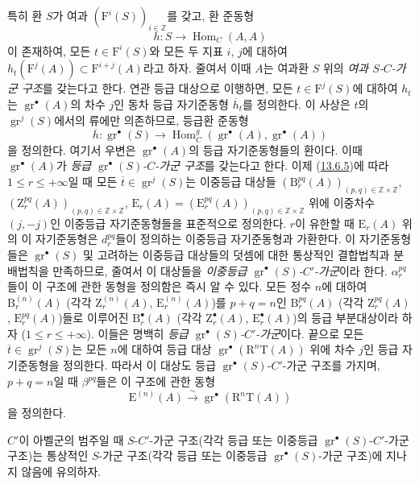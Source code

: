 \begin{env}[13.6.6]
\label{0.13.6.6-fr}
특히 환 $S$가 여과 $(\mathrm F^i(S))_{i\in\mathbb Z}$를 갖고,
환 준동형
\begin{equation}
\label{0.13.6.6.1-fr}
\tag{13.6.6.1}
h:S\to\operatorname{Hom}_C(A,A)
\end{equation}
이 존재하여,
모든 $t\in\mathrm F^i(S)$와 모든 두 지표 $i$, $j$에 대하여
$h_t(\mathrm F^j(A))\subset\mathrm F^{i+j}(A)$라고 하자. 줄여서 이때
$A$는 여과환 $S$ 위의 \emph{여과 $S$-$C$-가군 구조}를 갖는다고 한다.
연관 등급 대상으로 이행하면, 모든 $t\in\mathrm F^j(S)$에 대하여
$h_t$는 $\operatorname{gr}^\bullet(A)$의 차수 $j$인 동차 등급
자기준동형 $\overline h_t$를 정의한다. 이 사상은 $t$의
$\operatorname{gr}^j(S)$에서의 류에만 의존하므로, 등급환 준동형
\[
\overline h:\operatorname{gr}^\bullet(S)\to
\operatorname{Hom}_C^g(\operatorname{gr}^\bullet(A),
\operatorname{gr}^\bullet(A))
\]
을 정의한다. 여기서 우변은 $\operatorname{gr}^\bullet(A)$의 등급
자기준동형들의 환이다. 이때 $\operatorname{gr}^\bullet(A)$가
\emph{등급 $\operatorname{gr}^\bullet(S)$-$C$-가군 구조}를 갖는다고
한다. 이제 (\hyperref[0.13.6.5-fr]{13.6.5})에 따라
$1\leq r\leq+\infty$일 때 모든
$\overline t\in\operatorname{gr}^j(S)$는 이중등급 대상들
$(\mathrm B_r^{pq}(A))_{(p,q)\in\mathbb Z\times\mathbb Z}$,
$(\mathrm Z_r^{pq}(A))_{(p,q)\in\mathbb Z\times\mathbb Z}$,
$\mathrm E_r(A)=(\mathrm E_r^{pq}(A))_{(p,q)\in\mathbb Z\times\mathbb Z}$
위에 이중차수 $(j,-j)$인 이중등급 자기준동형들을 표준적으로 정의한다.
$r$이 유한할 때 $\mathrm E_r(A)$ 위의 이 자기준동형은
$d_r^{pq}$들이 정의하는 이중등급 자기준동형과 가환한다. 이 자기준동형들은
$\operatorname{gr}^\bullet(S)$ 및 고려하는 이중등급 대상들의 덧셈에 대한
통상적인 결합법칙과 분배법칙을 만족하므로, 줄여서 이 대상들을
\emph{이중등급 $\operatorname{gr}^\bullet(S)$-$C'$-가군}이라 한다.
$\alpha_r^{pq}$들이 이 구조에 관한 동형을 정의함은 즉시 알 수 있다.
모든 정수 $n$에 대하여 $\mathrm B_r^{(n)}(A)$ (각각
$\mathrm Z_r^{(n)}(A)$, $\mathrm E_r^{(n)}(A)$)를
$p+q=n$인 $\mathrm B_r^{pq}(A)$ (각각 $\mathrm Z_r^{pq}(A)$,
$\mathrm E_r^{pq}(A)$)들로 이루어진 $\mathrm B_r^\bullet(A)$ (각각
$\mathrm Z_r^\bullet(A)$, $\mathrm E_r^\bullet(A)$)의 등급 부분대상이라
하자 ($1\leq r\leq+\infty$). 이들은 명백히
\emph{등급 $\operatorname{gr}^\bullet(S)$-$C'$-가군}이다. 끝으로 모든
$\overline t\in\operatorname{gr}^j(S)$는 모든 $n$에 대하여 등급 대상
$\operatorname{gr}^\bullet(\mathrm R^n\mathrm T(A))$ 위에 차수 $j$인
등급 자기준동형을 정의한다. 따라서 이 대상도 등급
$\operatorname{gr}^\bullet(S)$-$C'$-가군 구조를 가지며, $p+q=n$일 때
$\beta^{pq}$들은 이 구조에 관한 동형
\[
\mathrm E^{(n)}(A)\xrightarrow{\sim}
\operatorname{gr}^\bullet(\mathrm R^n\mathrm T(A))
\]
을 정의한다.

$C'$이 아벨군의 범주일 때 $S$-$C'$-가군 구조(각각 등급 또는 이중등급
$\operatorname{gr}^\bullet(S)$-$C'$-가군 구조)는 통상적인 $S$-가군
구조(각각 등급 또는 이중등급 $\operatorname{gr}^\bullet(S)$-가군
구조)에 지나지 않음에 유의하자.
\end{env}

